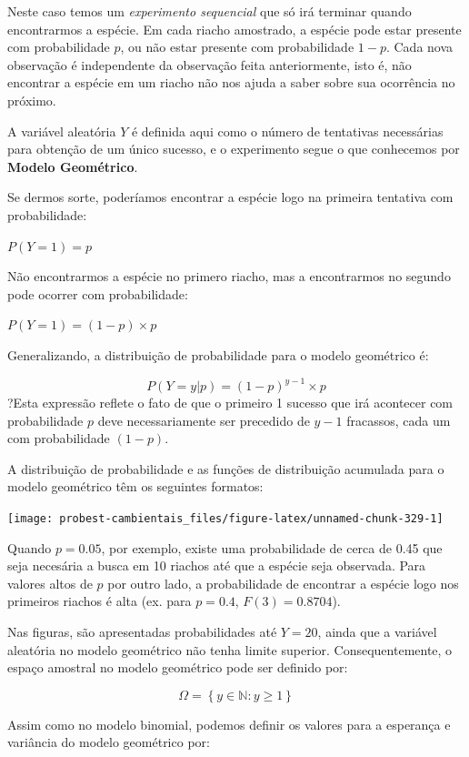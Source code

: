 \documentclass[
]{book}
\begin{document}
Neste caso temos um \emph{experimento sequencial} que só irá terminar quando encontrarmos a espécie. Em cada riacho amostrado, a espécie pode estar presente com probabilidade \(p\), ou não estar presente com probabilidade \(1-p\). Cada nova observação é independente da observação feita anteriormente, isto é, não encontrar a espécie em um riacho não nos ajuda a saber sobre sua ocorrência no próximo.

A variável aleatória \(Y\) é definida aqui como o número de tentativas necessárias para obtenção de um único sucesso, e o experimento segue o que conhecemos por \textbf{Modelo Geométrico}.

Se dermos sorte, poderíamos encontrar a espécie logo na primeira tentativa com probabilidade:

\(P(Y = 1) = p\)

Não encontrarmos a espécie no primero riacho, mas a encontrarmos no segundo pode ocorrer com probabilidade:

\(P(Y = 1) = (1-p) \times p\)

Generalizando, a distribuição de probabilidade para o modelo geométrico é:

\[P(Y = y|p) = (1-p)^{y-1} \times p\]
?Esta expressão reflete o fato de que o primeiro 1 sucesso que irá acontecer com probabilidade \(p\) deve necessariamente ser precedido de \(y-1\) fracassos, cada um com probabilidade \((1-p)\).

A distribuição de probabilidade e as funções de distribuição acumulada para o modelo geométrico têm os seguintes formatos:

\begin{center}\texttt{[image: probest-cambientais\_files/figure-latex/unnamed-chunk-329-1]} \end{center}

Quando \(p = 0.05\), por exemplo, existe uma probabilidade de cerca de 0.45 que seja necesária a busca em 10 riachos até que a espécie seja observada. Para valores altos de \(p\) por outro lado, a probabilidade de encontrar a espécie logo nos primeiros riachos é alta (ex. para \(p = 0.4\), \(F(3) = 0.8704\)).

Nas figuras, são apresentadas probabilidades até \(Y = 20\), ainda que a variável aleatória no modelo geométrico não tenha limite superior. Consequentemente, o espaço amostral no modelo geométrico pode ser definido por:

\[\Omega = \left\{ y \in \mathbb{N}: y \ge 1 \right\}\]

Assim como no modelo binomial, podemos definir os valores para a esperança e variância do modelo geométrico por:
\end{document}
